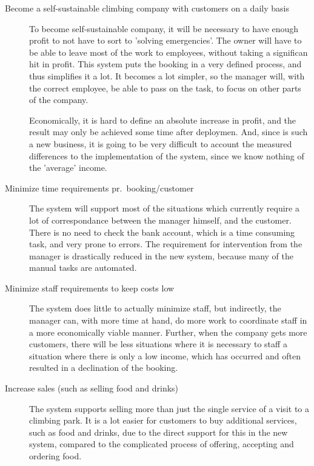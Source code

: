 \begin{description}
\item[Become a self-sustainable climbing company with customers on a daily basis]
To become self-sustainable company, it will be necessary to have enough profit
to not have to sort to 'solving emergencies'. The owner will have to be able 
to leave most of the work to employees, without taking a significan hit in 
profit. This system puts the booking in a very defined process, and thus 
simplifies it a lot. It becomes a lot simpler, so the manager will,
with the correct employee, be able to pass on the task, to focus on other parts
of the company.

Economically, it is hard to define an absolute increase in profit, and the 
result may only be achieved some time after deploymen. And, since 
\gomonkey{} is such a new business, it is going to be very difficult to account
the measured differences to the implementation of the system, since we know 
nothing of the 'average' income.

\item[Minimize time requirements pr.\ booking/customer]
The system will support most
of the situations which currently require a lot of correspondance between the 
manager himself, and the customer. There is no need to check the bank account,
which is a time consuming task, and very prone to errors. The requirement for 
intervention from the manager is drastically reduced in the new system, because
many of the manual tasks are automated.

\item[Minimize staff requirements to keep costs low]
The system does little to actually minimize staff, but indirectly, the manager
can, with more time at hand, do more work to coordinate staff in a more 
economically viable manner. Further, when the company gets more customers,
there will be less situations where it is necessary to staff a situation where
there is only a low income, which has occurred and often resulted in a declination
of the booking.

\item[Increase sales (such as selling food and drinks)]
The system supports selling more than just the single service of a visit to a climbing park. It is a lot
easier for customers to buy additional services, such as food and drinks, due to 
the direct support for this in the new system, compared to the complicated 
process of offering, accepting and ordering food.
\end{description}

